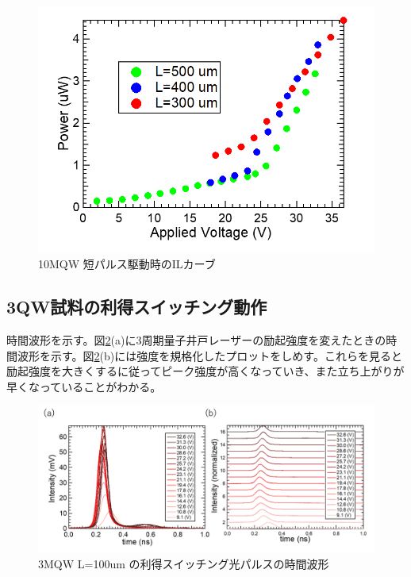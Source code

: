 {\begin{figure}[h]
	\centering
	\includegraphics[width=15cm]{figure/fig_3_2_10QW_ridge_GS_power.png}
		\caption{10MQW 短パルス駆動時のILカーブ}
		\label{fig:fig_3_2_10QW_ridge_GS_power}
\end{figure}
\clearpage
\subsection{3QW試料の利得スイッチング動作}%
時間波形を示す。図\ref{fig:fig_3_2_3QW_ridge_L100_GS}(a)に3周期量子井戸レーザーの励起強度を変えたときの時間波形を示す。図\ref{fig:fig_3_2_3QW_ridge_L100_GS}(b)には強度を規格化したプロットをしめす。これらを見ると励起強度を大きくするに従ってピーク強度が高くなっていき、また立ち上がりが早くなっていることがわかる。
\begin{figure}[h]
	\centering
	\includegraphics[width=15cm]{figure/fig_3_2_3QW_ridge_L100_GS.png}
		\caption{3MQW L=100um の利得スイッチング光パルスの時間波形}
		\label{fig:fig_3_2_3QW_ridge_L100_GS}
\end{figure}

}
